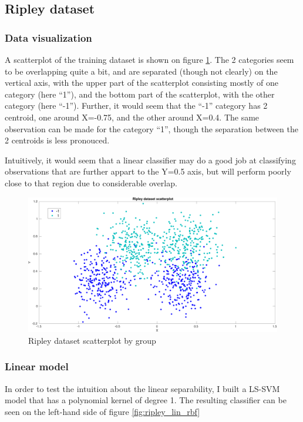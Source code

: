 \documentclass[11pt, a4paper]{article}
\begin{document}
\subsection{Ripley dataset}
\subsubsection{Data visualization}

A scatterplot of the training dataset is shown on figure
\ref{fig:ripley_scatter}. The 2 categories seem to be overlapping
quite a bit, and are separated (though not clearly) on the vertical
axis, with the upper part of the scatterplot consisting mostly of one
category (here ``1''), and the bottom part of the scatterplot, with
the other category (here ``-1''). Further, it would seem that the
``-1'' category has 2 centroid, one around X=-0.75, and the other
around X=0.4. The same observation can be made for the category ``1'',
though the separation between the 2 centroids is less pronouced. 

Intuitively, it would seem that a linear classifier may do a good job
at classifying observations that are further appart to the Y=0.5 axis,
but will perform poorly close to that region due to considerable
overlap.

\begin{figure}[H]
    \centering
    \includegraphics[scale=.40]{ripley_scatter.pdf}
    \caption{Ripley dataset scatterplot by group}
    \label{fig:ripley_scatter}
\end{figure}

\subsubsection{Linear model}

In order to test the intuition about the linear separability, I built
a LS-SVM model that has a polynomial kernel of degree 1. The resulting
classifier can be seen on the left-hand side of figure
\ref{fig:ripley_lin_rbf}
\end{document}
